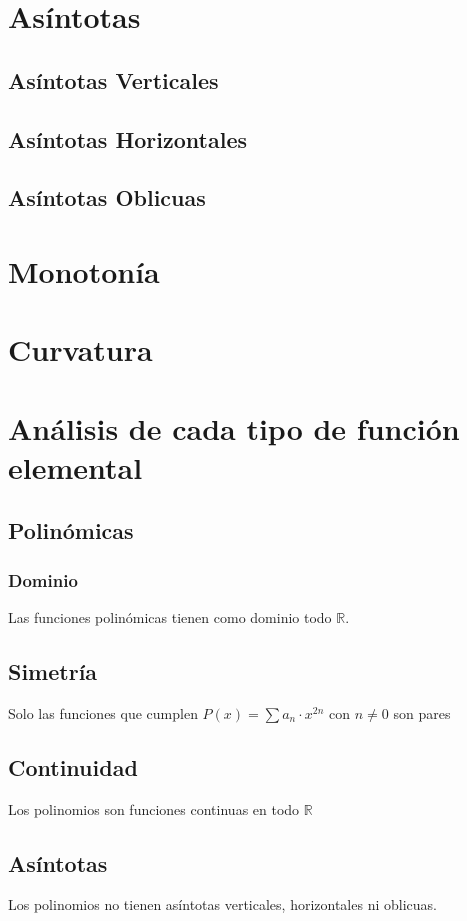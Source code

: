 \section{Asíntotas}
\subsection*{Asíntotas Verticales}
\subsection*{Asíntotas Horizontales}
\subsection*{Asíntotas Oblicuas}
\section{Monotonía}
\section{Curvatura}

\section{Análisis de cada tipo de función elemental}
\subsection*{Polinómicas}
\subsubsection*{Dominio}
\noindent
Las funciones polinómicas tienen como dominio todo $\mathbb{R}$.
\subsection*{Simetría}
\noindent
Solo las funciones que cumplen $P(x)=\sum a_n\cdot x^{2n}$ con $n\neq 0$ son pares  
\subsection*{Continuidad}
\noindent
Los polinomios son funciones continuas en todo $\mathbb{R}$
\subsection*{Asíntotas}
Los polinomios no tienen asíntotas verticales, horizontales ni oblicuas.
